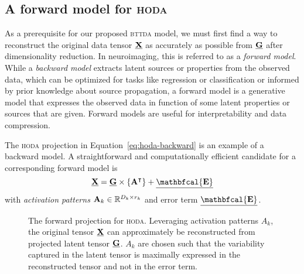 \documentclass[twocolumn]{article}
\begin{document}
\subsection{A forward model for \textsc{hoda}}
As a prerequisite for our proposed \textsc{bttda} model, we must first find a
way to reconstruct the original data tensor $\underline{\mathbf{X}}$ as accurately as possible
from $\underline{\mathbf{G}}$ after dimensionality reduction.
In neuroimaging, this is referred to as a \emph{forward model}.
While a \emph{backward model} extracts latent sources or properties from the observed
data, which can be optimized for tasks like regression or classification or
informed by prior knowledge about source propagation, a forward model is a
generative model that expresses the observed data in function of some latent
properties or sources that are given. Forward models are useful for
interpretability and data compression.

The \textsc{hoda} projection in Equation~\ref{eq:hoda-backward} is an example
of a backward model.
A straightforward and computationally efficient candidate for a corresponding
forward model is
\begin{equation}
	\ten{X} = \ten{G}\mmpr{\mat{A}^\intercal} + \ten{\mathbfcal{E}}
	\label{eq:hoda-forward}
\end{equation}
with \emph{activation patterns} $\mathbf{A}_k \in \mathbb{R}^{D_k\times r_k}$
and error term $\ten{\mathbfcal{E}}$.
\begin{figure}[t]
	\centering
	
	\caption{The forward projection for \textsc{hoda}. Leveraging activation
		patterns $A_k$, the original tensor $\underline{\mathbf{X}}$ can approximately be
		reconstructed from projected latent tensor $\underline{\mathbf{G}}$. $A_k$ are chosen such
		that the variability captured in the latent tensor is maximally expressed in
		the reconstructed tensor and not in the error term.}
	\label{fig:hoda-forward}
\end{figure}
\end{document}
